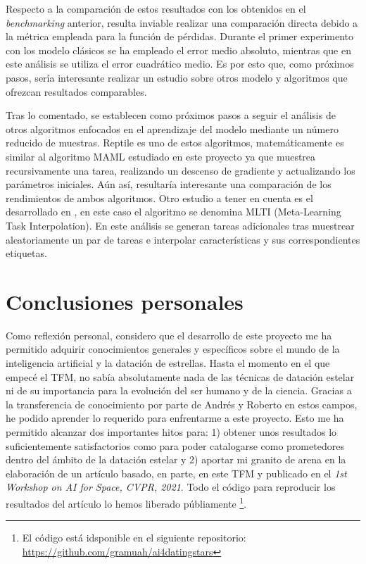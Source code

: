 Respecto a la comparación de estos resultados con los obtenidos en el \emph{benchmarking} anterior, resulta inviable realizar una comparación directa debido a la métrica empleada para la función de pérdidas. Durante el primer experimento con los modelo clásicos se ha empleado el error medio absoluto, mientras que en este análisis se utiliza el error cuadrático medio. Es por esto que, como próximos pasos, sería interesante realizar un estudio sobre otros modelo y algoritmos que ofrezcan resultados comparables.

Tras lo comentado, se establecen como próximos pasos a seguir el análisis de otros algoritmos enfocados en el aprendizaje del modelo mediante un número reducido de muestras. Reptile \cite{nichol2018firstorder} es uno de estos algoritmos, matemáticamente es similar al algoritmo MAML estudiado en este proyecto ya que muestrea recursivamente una tarea, realizando un descenso de gradiente y actualizando los parámetros iniciales. Aún así, resultaría interesante una comparación de los rendimientos de ambos algoritmos. Otro estudio a tener en cuenta es el desarrollado en \cite{yao2021metalearning}, en este caso el algoritmo se denomina MLTI (Meta-Learning Task Interpolation). En este análisis se generan tareas adicionales tras muestrear aleatoriamente un par de tareas e interpolar características y sus correspondientes etiquetas.
 

\section{Conclusiones personales}

Como reflexión personal, considero que el desarrollo de este proyecto me ha permitido adquirir conocimientos generales y específicos sobre el mundo de la inteligencia artificial y la datación de estrellas. Hasta el momento en el que empecé el TFM, no sabía absolutamente nada de las técnicas de datación estelar ni de su importancia para la evolución del ser humano y de la ciencia. Gracias a la transferencia de conocimiento por parte de Andrés y Roberto en estos campos, he podido aprender lo requerido para enfrentarme a este proyecto. Esto me ha permitido alcanzar dos importantes hitos para: 1) obtener unos resultados lo suficientemente satisfactorios como para poder catalogarse como prometedores dentro del ámbito de la datación estelar y 2) aportar mi granito de arena en la elaboración de un artículo \cite{AI4STARTS} basado, en parte, en este TFM y publicado en el \emph{1st Workshop on AI for Space, CVPR, 2021}. Todo el código para reproducir los resultados del artículo lo hemos liberado públiamente \footnote{El código está idsponible en el siguiente repositorio: \url{https://github.com/gramuah/ai4datingstars}}.  %

